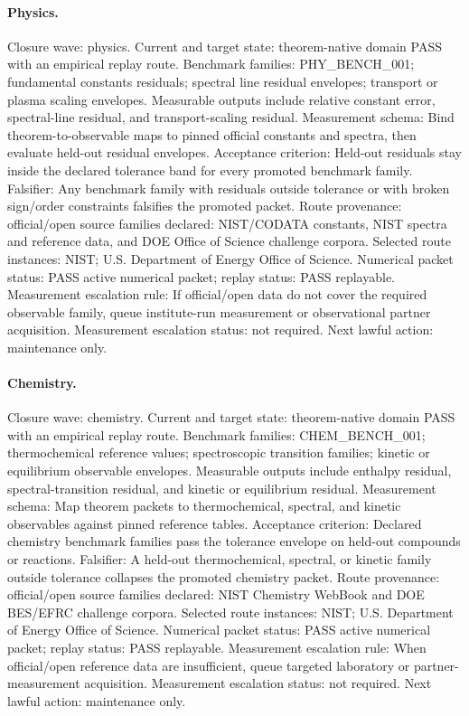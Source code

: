 \paragraph{Physics.}
Closure wave: physics. Current and target state: theorem-native domain PASS with an empirical replay route.
Benchmark families: PHY\_BENCH\_001; fundamental constants residuals; spectral line residual envelopes; transport or plasma scaling envelopes.
Measurable outputs include relative constant error, spectral-line residual, and
transport-scaling residual.
Measurement schema: Bind theorem-to-observable maps to pinned official constants and spectra, then evaluate held-out residual envelopes.
Acceptance criterion: Held-out residuals stay inside the declared tolerance band for every promoted benchmark family.
Falsifier: Any benchmark family with residuals outside tolerance or with broken sign/order constraints falsifies the promoted packet.
Route provenance: official/open source families declared: NIST/CODATA constants, NIST spectra and reference data, and DOE Office of Science challenge corpora.
Selected route instances: NIST; U.S. Department of Energy Office of Science.
Numerical packet status: PASS active numerical packet; replay status: PASS replayable.
Measurement escalation rule: If official/open data do not cover the required observable family, queue institute-run measurement or observational partner acquisition.
Measurement escalation status: not required.
Next lawful action: maintenance only.

\paragraph{Chemistry.}
Closure wave: chemistry. Current and target state: theorem-native domain PASS with an empirical replay route.
Benchmark families: CHEM\_BENCH\_001; thermochemical reference values; spectroscopic transition families; kinetic or equilibrium observable envelopes.
Measurable outputs include enthalpy residual, spectral-transition residual, and
kinetic or equilibrium residual.
Measurement schema: Map theorem packets to thermochemical, spectral, and kinetic observables against pinned reference tables.
Acceptance criterion: Declared chemistry benchmark families pass the tolerance envelope on held-out compounds or reactions.
Falsifier: A held-out thermochemical, spectral, or kinetic family outside tolerance collapses the promoted chemistry packet.
Route provenance: official/open source families declared: NIST Chemistry WebBook and DOE BES/EFRC challenge corpora.
Selected route instances: NIST; U.S. Department of Energy Office of Science.
Numerical packet status: PASS active numerical packet; replay status: PASS replayable.
Measurement escalation rule: When official/open reference data are insufficient, queue targeted laboratory or partner-measurement acquisition.
Measurement escalation status: not required.
Next lawful action: maintenance only.

